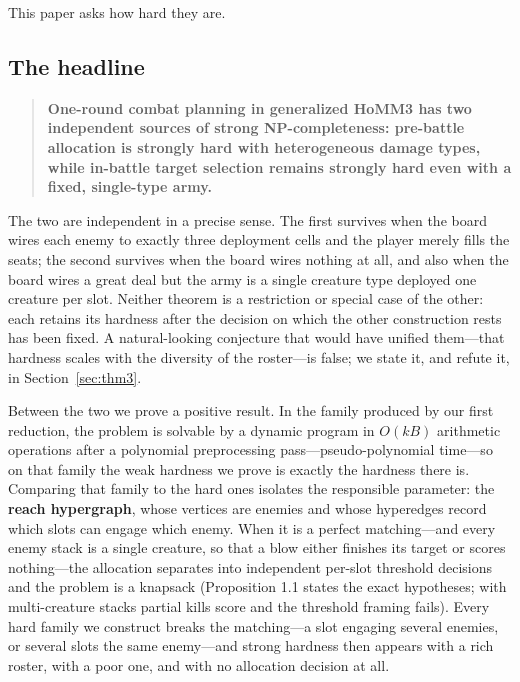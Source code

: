 \documentclass[11pt,a4paper]{article}
\theoremstyle{plain}
\theoremstyle{definition}
\theoremstyle{plain}
\theoremstyle{definition}
\theoremstyle{remark}
\begin{document}
This paper asks how hard they are.

\subsection{The headline}\label{sec:headline}

\begin{quote}
\textbf{One-round combat planning in generalized HoMM3 has two independent sources of strong
NP-completeness: pre-battle allocation is strongly hard with heterogeneous damage types,
while in-battle target selection remains strongly hard even with a fixed, single-type army.}
\end{quote}

The two are independent in a precise sense. The first survives when the board wires each
enemy to exactly three deployment cells and the player merely fills the seats; the second
survives when the board wires nothing at all, and also when the board wires a great deal but
the army is a single creature type deployed one creature per slot. Neither theorem is a
restriction or special case of the other: each retains its hardness after the decision on
which the other construction rests has been fixed. A natural-looking conjecture that would
have unified them---that hardness scales with the diversity of the roster---is false; we state
it, and refute it, in Section~\ref{sec:thm3}.

Between the two we prove a positive result. In the family produced by our first reduction,
the problem is solvable by a dynamic program in $O(kB)$ arithmetic operations after a
polynomial preprocessing pass---pseudo-polynomial time---so on that family the weak hardness we
prove is exactly the hardness there is. Comparing that family to the hard ones isolates the
responsible parameter: the \textbf{reach hypergraph}, whose vertices are enemies and whose
hyperedges record which slots can engage which enemy. When it is a perfect matching---and
every enemy stack is a single creature, so that a blow either finishes its target or scores
nothing---the allocation separates into independent per-slot threshold decisions and the
problem is a knapsack (Proposition 1.1 states the exact hypotheses; with multi-creature
stacks partial kills score and the threshold framing fails). Every hard family we construct
breaks the matching---a slot engaging several
enemies, or several slots the same enemy---and strong hardness then appears with a rich
roster, with a poor one, and with no allocation decision at all.
\end{document}
